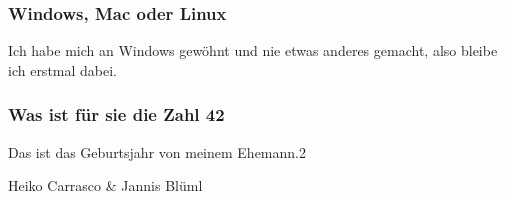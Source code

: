 {    \subsubsection*{Windows, Mac oder Linux}
    Ich habe mich an Windows gewöhnt und nie etwas anderes gemacht, also bleibe ich erstmal dabei.
    \subsubsection*{Was ist für sie die Zahl 42}
    Das ist das Geburtsjahr von meinem Ehemann.2

}{Heiko Carrasco \& Jannis Blüml}

\vfill
{}
